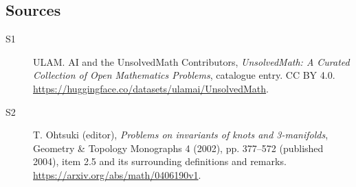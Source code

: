\documentclass[11pt]{article}
\begin{document}
\subsection{Sources}
\begin{description}
\item[\hypertarget{source:statement:1}{S1}] ULAM. AI and the UnsolvedMath Contributors, \emph{UnsolvedMath: A Curated Collection of Open Mathematics Problems}, catalogue entry. CC BY 4.0. \url{https://huggingface.co/datasets/ulamai/UnsolvedMath}.
\item[\hypertarget{source:statement:2}{S2}] T. Ohtsuki (editor), \emph{Problems on invariants of knots and 3-manifolds}, Geometry \& Topology Monographs 4 (2002), pp. 377--572 (published 2004), item 2.5 and its surrounding definitions and remarks. \url{https://arxiv.org/abs/math/0406190v1}.
\end{description}
\label{end:statement}
\end{document}
